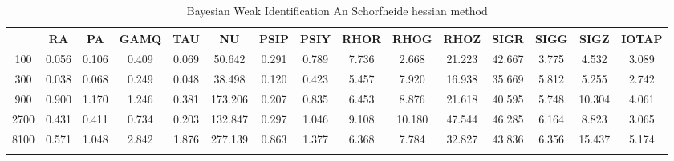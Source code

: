 \documentclass[a4paper,10pt]{article}
\begin{document}
\centering
\begin{longtable}{ccccccccccccccc}
\toprule
 & RA & PA & GAMQ & TAU & NU & PSIP & PSIY & RHOR & RHOG & RHOZ & SIGR & SIGG & SIGZ & IOTAP \\
\midrule
100 & 0.056 & 0.106 & 0.409 & 0.069 & 50.642 & 0.291 & 0.789 & 7.736 & 2.668 & 21.223 & 42.667 & 3.775 & 4.532 & 3.089 \\
300 & 0.038 & 0.068 & 0.249 & 0.048 & 38.498 & 0.120 & 0.423 & 5.457 & 7.920 & 16.938 & 35.669 & 5.812 & 5.255 & 2.742 \\
900 & 0.900 & 1.170 & 1.246 & 0.381 & 173.206 & 0.207 & 0.835 & 6.453 & 8.876 & 21.618 & 40.595 & 5.748 & 10.304 & 4.061 \\
2700 & 0.431 & 0.411 & 0.734 & 0.203 & 132.847 & 0.297 & 1.046 & 9.108 & 10.180 & 47.544 & 46.285 & 6.164 & 8.823 & 3.065 \\
8100 & 0.571 & 1.048 & 2.842 & 1.876 & 277.139 & 0.863 & 1.377 & 6.368 & 7.784 & 32.827 & 43.836 & 6.356 & 15.437 & 5.174 \\
\bottomrule
\caption{Bayesian Weak Identification An Schorfheide hessian method}
\label{table:tbl:WeakAnScho_hessian}
\end{longtable}
\end{document}
